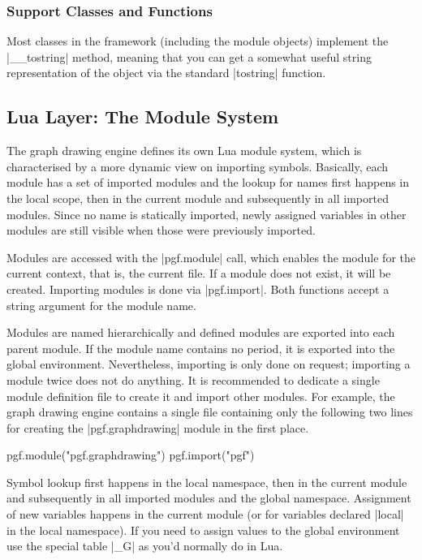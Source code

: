 \subsubsection{Support Classes and Functions}

Most classes in the framework (including the module objects) implement
the |__tostring| method, meaning that you can get a somewhat useful
string representation of the object via the standard |tostring|
function.








\subsection{Lua Layer: The Module System}
  
The graph drawing engine defines its own Lua module system, which is
characterised by a more dynamic view on importing symbols.  Basically,
each module has a set of imported modules and the lookup for names
first happens in the local scope, then in the current module and
subsequently in all imported modules.  Since no name is statically
imported, newly assigned variables in other modules are still visible
when those were previously imported.

Modules are accessed with the |pgf.module| call, which enables the
module for the current context, that is, the current file. If a module
does not exist, it will be created.  Importing modules is done via
|pgf.import|.  Both functions accept a string argument for the
module name.

Modules are named hierarchically and defined modules are exported into
each parent module.  If the module name contains no period, it is
exported into the global environment.  Nevertheless, importing is only
done on request; importing a module twice does not do anything.
It is recommended to dedicate a single module definition file
to create it and import other modules.  For example, the graph drawing
engine contains a single file containing only the following two lines for
creating the |pgf.graphdrawing| module in the first place.

\begin{codeexample}
pgf.module("pgf.graphdrawing")
pgf.import("pgf")
\end{codeexample}

Symbol lookup first happens in the local namespace, then in the
current module and subsequently in all imported modules and the global
namespace.  Assignment of new variables happens in the current module
(or for variables declared |local| in the local namespace).  If you
need to assign values to the global environment use the special table
|_G| as you'd normally do in Lua.

